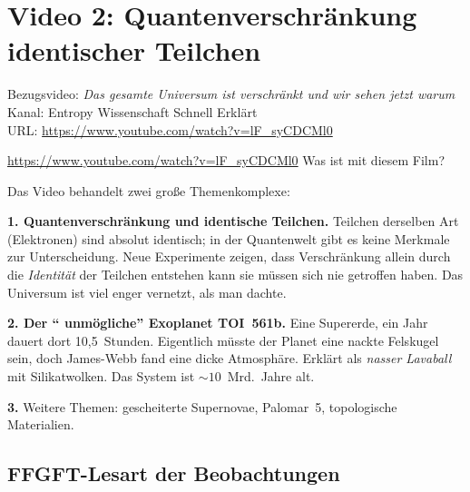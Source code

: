 \section{Video 2: Quantenverschr\"ankung identischer Teilchen}

\begin{videobox}
Bezugsvideo: \emph{Das gesamte Universum ist verschr\"ankt \textendash{} und wir sehen jetzt warum} \\
Kanal: Entropy \textendash{} Wissenschaft Schnell Erkl\"art \\
URL: \url{https://www.youtube.com/watch?v=lF_syCDCMl0}
\end{videobox}

\begin{userbox}
\url{https://www.youtube.com/watch?v=lF_syCDCMl0} \quad Was ist mit diesem Film?
\end{userbox}

\begin{geminibox}
Das Video behandelt zwei gro{\ss}e Themenkomplexe:

\textbf{1. Quantenverschr\"ankung und identische Teilchen.} Teilchen derselben Art (Elektronen) sind absolut identisch; in der Quantenwelt gibt es keine Merkmale zur Unterscheidung. Neue Experimente zeigen, dass Verschr\"ankung allein durch die \emph{Identit\"at} der Teilchen entstehen kann \textendash{} sie m\"ussen sich nie getroffen haben. Das Universum ist viel enger vernetzt, als man dachte.

\textbf{2. Der \textquotedblleft{} unm\"ogliche\textquotedblright{}{} Exoplanet TOI~561b.} Eine Supererde, ein Jahr dauert dort 10{,}5~Stunden. Eigentlich m\"usste der Planet eine nackte Felskugel sein, doch James-Webb fand eine dicke Atmosph\"are. Erkl\"art als \emph{nasser Lavaball} mit Silikatwolken. Das System ist $\sim 10$~Mrd.~Jahre alt.

\textbf{3.} Weitere Themen: gescheiterte Supernovae, Palomar~5, topologische Materialien.
\end{geminibox}

\subsection{FFGFT-Lesart der Beobachtungen}

